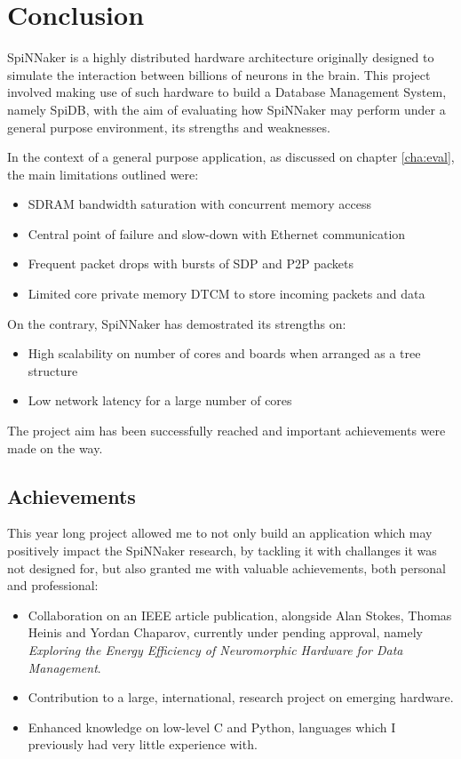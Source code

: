 \chapter{Conclusion}
\label{cha:conclusion}
SpiNNaker is a highly distributed hardware architecture originally designed to simulate the interaction between billions of neurons in the brain. This project involved making use of such hardware to build a Database Management System, namely SpiDB, with the aim of evaluating how SpiNNaker may perform under a general purpose environment, its strengths and weaknesses.

In the context of a general purpose application, as discussed on chapter \ref{cha:eval}, the main limitations outlined were:
\begin{itemize}
\setlength\itemsep{-0.3em}
	\item SDRAM bandwidth saturation with concurrent memory access
	\item Central point of failure and slow-down with Ethernet communication
	\item Frequent packet drops with bursts of SDP and P2P packets
	\item Limited core private memory DTCM to store incoming packets and data
\end{itemize}

On the contrary, SpiNNaker has demostrated its strengths on:
\begin{itemize}
\setlength\itemsep{-0.3em}
	\item High scalability on number of cores and boards when arranged as a tree structure
	\item Low network latency for a large number of cores
\end{itemize}

The project aim has been successfully reached and important achievements were made on the way.

\section{Achievements}
This year long project allowed me to not only build an application which may positively impact the SpiNNaker research, by tackling it with challanges it was not designed for, but also granted me with valuable achievements, both personal and professional:

\begin{itemize}
	\item Collaboration on an IEEE article publication, alongside Alan Stokes, Thomas Heinis and Yordan Chaparov, currently under pending approval, namely \textit{Exploring the Energy Efficiency of Neuromorphic Hardware for Data Management}.
	\item Contribution to a large, international, research project on emerging hardware.
	\item Enhanced knowledge on low-level C and Python, languages which I previously had very little experience with.
\end{itemize}

